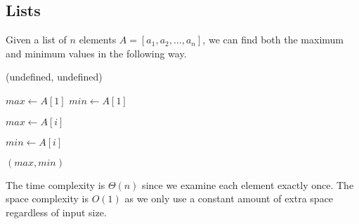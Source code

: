 \subsection{Lists} 

  \begin{algo}
    Given a list of $n$ elements $A = [a_1, a_2, \ldots, a_n]$, we can find both the maximum and minimum values in the following way.
    \begin{algorithmic}[1]
       
         
          \State \Return (undefined, undefined)
        \EndIf
        
        \State $max \gets A[1]$ 
        \State $min \gets A[1]$ 
        
         
           
            \State $max \gets A[i]$
          \EndIf
          
           
            \State $min \gets A[i]$
          \EndIf
        \EndFor
        
        \State \Return $(max, min)$ 
      \EndProcedure
    \end{algorithmic}
    The time complexity is $\Theta(n)$ since we examine each element exactly once. The space complexity is $O(1)$ as we only use a constant amount of extra space regardless of input size.
  \end{algo}
  
